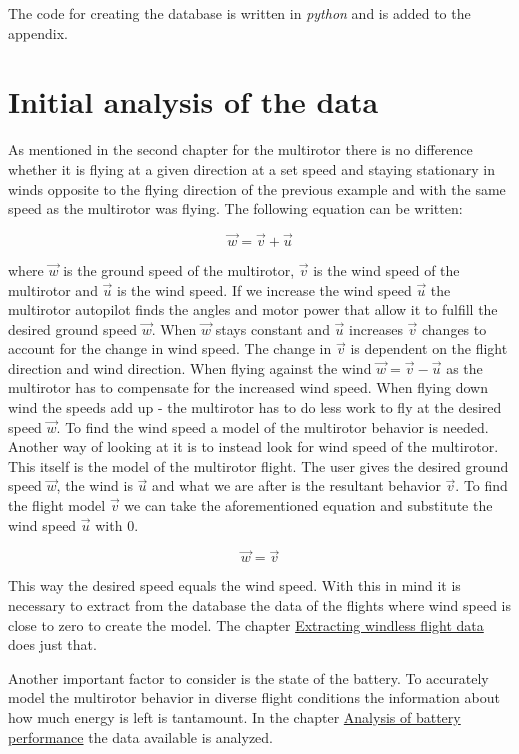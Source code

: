 \documentclass[12pt,oneside]{reedthesis}
\theoremstyle{definition}
\theoremstyle{definition}
\theoremstyle{definition}
\theoremstyle{remark}
\begin{document}
The code for creating the database is written in \emph{python} and is
added to the appendix.

\chapter{Initial analysis of the
data}\label{initial-analysis-of-the-data}

As mentioned in the second chapter for the multirotor there is no
difference whether it is flying at a given direction at a set speed and
staying stationary in winds opposite to the flying direction of the
previous example and with the same speed as the multirotor was flying.
The following equation can be written:

\[\vec{w} = \vec{v} + \vec{u}\]

where \(\vec{w}\) is the ground speed of the multirotor, \(\vec{v}\) is
the wind speed of the multirotor and \(\vec{u}\) is the wind speed. If
we increase the wind speed \(\vec{u}\) the multirotor autopilot finds
the angles and motor power that allow it to fulfill the desired ground
speed \(\vec{w}\). When \(\vec{w}\) stays constant and \(\vec{u}\)
increases \(\vec{v}\) changes to account for the change in wind speed.
The change in \(\vec{v}\) is dependent on the flight direction and wind
direction. When flying against the wind \(\vec{w} = \vec{v} - \vec{u}\)
as the multirotor has to compensate for the increased wind speed. When
flying down wind the speeds add up - the multirotor has to do less work
to fly at the desired speed \(\vec{w}\). To find the wind speed a model
of the multirotor behavior is needed. Another way of looking at it is to
instead look for wind speed of the multirotor. This itself is the model
of the multirotor flight. The user gives the desired ground speed
\(\vec{w}\), the wind is \(\vec{u}\) and what we are after is the
resultant behavior \(\vec{v}\). To find the flight model \(\vec{v}\) we
can take the aforementioned equation and substitute the wind speed
\(\vec{u}\) with 0.

\[\vec{w} = \vec{v}\]

This way the desired speed equals the wind speed. With this in mind it
is necessary to extract from the database the data of the flights where
wind speed is close to zero to create the model. The chapter
\protect\hyperlink{extracting-windless-flight-data}{Extracting windless
flight data} does just that.

Another important factor to consider is the state of the battery. To
accurately model the multirotor behavior in diverse flight conditions
the information about how much energy is left is tantamount. In the
chapter \protect\hyperlink{analysis-of-battery-performance}{Analysis of
battery performance} the data available is analyzed.
\end{document}
